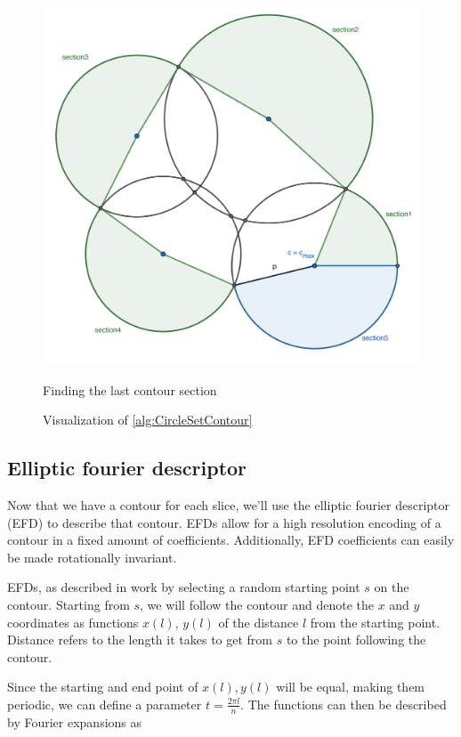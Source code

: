 \begin{figure}[!htb]
  \endminipage\hfill
    \includegraphics[width=1.0\textwidth]{figures/contour/c3copy.pdf}
    \caption{Finding the last contour section}
  \endminipage
  \caption[Visualization of CircleSetContour algorithm]{Visualization of \autoref{alg:CircleSetContour}}
  \label{fig:circlesetcontour}
\end{figure}


\subsection{Elliptic fourier descriptor}

Now that we have a contour for each slice, we'll use the elliptic fourier descriptor (EFD) to describe that contour.
EFDs allow for a high resolution encoding of a contour in a fixed amount of coefficients.
Additionally, EFD coefficients can easily be made rotationally invariant.

EFDs, as described in \cite{LIN1987535} work by selecting a random starting point $s$ on the contour.
Starting from $s$, we will follow the contour and denote the $x$ and $y$ coordinates as functions $x(l)$, $y(l)$ of the distance $l$ from the starting point.
Distance refers to the length it takes to get from $s$ to the point following the contour.

Since the starting and end point of $x(l), y(l)$ will be equal, making them periodic, we can define a parameter $t=\frac{2\pi l}{n}$. %
The functions can then be described by Fourier expansions as

